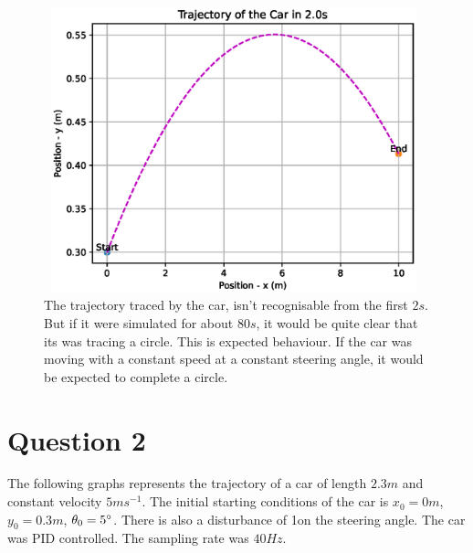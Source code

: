 \documentclass[10pt]{article}
\begin{document}
\begin{figure}
\centering
\includegraphics[width=11cm, height=8.25cm]{q1Trajectory.eps}
\caption
{The trajectory traced by the car, isn’t recognisable from the first $2\si{s}$. But if it were simulated for about $80\si{s}$, it would be quite clear that its was tracing a circle. This is expected behaviour. If the car was moving with a constant speed at a constant steering angle, it would be expected to complete a circle.}
\end{figure}

\newpage
\section{Question 2}
The following graphs represents the trajectory of a car of length $2.3\si{m}$ and constant velocity $5\si{ms^{-1}}$. The initial starting conditions of the car is $x_0 = 0\si{m}$, $y_0 = 0.3\si{m}$, $\theta_0 = 5\degree$. There is also a disturbance of 1\degree on the steering angle. The car was PID controlled. The sampling rate was $40\si{Hz}$.
\end{document}
